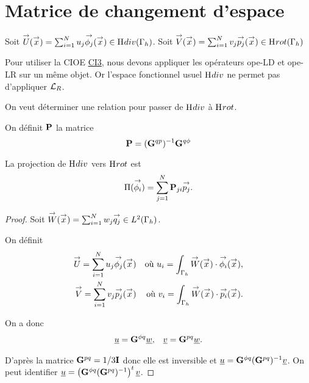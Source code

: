 \section{Matrice de changement d'espace}

  Soit \(\vect{U}(\vx) = \sum_{i=1}^N u_j \phij(\vx) \in \Hdiv(\Gamma_h)\).
  Soit \(\vect{V}(\vx) = \sum_{i=1}^N v_j \pj(\vx) \in \Hrot(\Gamma_h)\)  

  Pour utiliser la CIOE \hyperlink{ci3}{CI3}, nous devons appliquer les opérateurs \gls{ope-LD} et \gls{ope-LR} sur un même objet. Or l'espace fonctionnel usuel \(\Hdiv\) ne permet pas d'appliquer \(\LR\). 

  On veut déterminer une relation pour passer de \(\Hdiv\) à \(\Hrot\).

  \begin{defn}On définit \(\mPP\) la matrice
  \label{def:eq_int:matrice_changment_mP}
    \begin{equation*}
      \mPP = (\mG{q}{p})^{-1}\mG{q}{\phi}
    \end{equation*}
  \end{defn}

  \begin{prop}La projection de \(\Hdiv\) vers \(\Hrot\) est
    \begin{equation*}
      \Pi(\phii) = \sum_{j=1}^N \mPP_{ji}\pj.
    \end{equation*}
  \end{prop}

  \begin{proof}
      Soit \(\vect{W}(\vx) = \sum_{i=1}^N w_j \qj \in L^2(\Gamma_h)\).

      On définit
      \begin{align*}
        \vect{U}= \sum_{i=1}^N u_j \phij(\vx) && \text{où~} u_i = \int_{\Gamma_h} \vect{W}(\vx)\cdot\phii(\vx),
        \\
        \vect{V} = \sum_{i=1}^N v_j \pj(\vx) && \text{où~} v_i = \int_{\Gamma_h} \vect{W}(\vx)\cdot\pii(\vx).
      \end{align*}

      On a donc
      \begin{align*}
        \comp{u}=\mG{\phi}{q}\comp{w},
        &&
        \comp{v}=\mG{p}{q}\comp{w}.
      \end{align*}

      D'après \cite[annexe B]{stupfel_implementation_2015} la matrice \(\mG{p}{q}=1/3\mI\) donc elle est inversible et \(\comp{u} = \mG{\phi}{q} (\mG{p}{q})^{-1} \comp{v}\). On peut identifier \(\comp{u}= \left(\mG{\phi}{q}(\mG{p}{q})^{-1}\right)^{t}\comp{v}\).

    \end{proof}

